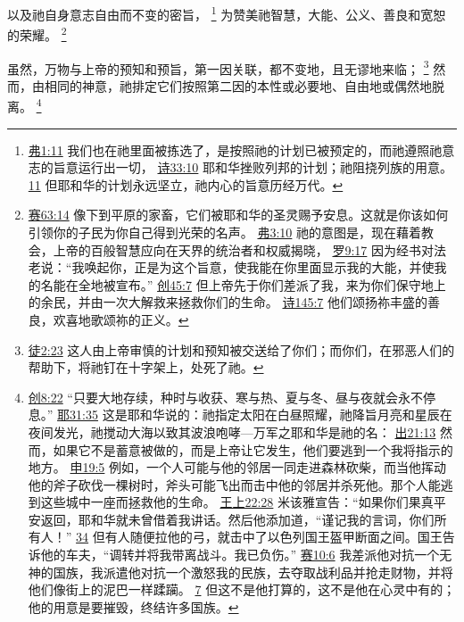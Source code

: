 \documentclass[12pt, a4paper, oneside]{ctexart}
\newcounter{parnum}[section]
\newcommand{\N}{%
   \noindent\refstepcounter{parnum}%
    \makebox[\parindent][l]{\textbf{\arabic{parnum}.}}}
\begin{document}
	以及祂自身意志自由而不变的密旨，
	\footnote {
		\href{https://biblehub.com/ephesians/1-11.htm}{弗1:11} 我们也在祂里面被拣选了，是按照祂的计划已被预定的，而祂遵照祂意志的旨意运行出一切，
		\href{https://biblehub.com/psalms/33-10.htm}{诗33:10} 耶和华挫败列邦的计划；祂阻挠列族的用意。
		\href{https://biblehub.com/psalms/33-11.htm}{11} 但耶和华的计划永远坚立，祂内心的旨意历经万代。
	}
	为赞美祂智慧，大能、公义、善良和宽恕的荣耀。
	\footnote {
		\href{https://biblehub.com/isaiah/63-14.htm}{赛63:14} 像下到平原的家畜，它们被耶和华的圣灵赐予安息。这就是你该如何引领你的子民为你自己得到光荣的名声。
		\href{https://biblehub.com/ephesians/3-10.htm}{弗3:10} 祂的意图是，现在藉着教会，上帝的百般智慧应向在天界的统治者和权威揭晓，
		\href{https://biblehub.com/romans/9-17.htm}{罗9:17} 因为经书对法老说：“我唤起你，正是为这个旨意，使我能在你里面显示我的大能，并使我的名能在全地被宣布。”
		\href{https://biblehub.com/genesis/45-7.htm}{创45:7} 但上帝先于你们差派了我，来为你们保守地上的余民，并由一次大解救来拯救你们的生命。
		\href{https://biblehub.com/psalms/145-7.htm}{诗145:7} 他们颂扬祢丰盛的善良，欢喜地歌颂祢的正义。
	}

\N 虽然，万物与上帝的预知和预旨，第一因关联，都不变地，且无谬地来临；
	\footnote {
		\href{https://biblehub.com/acts/2-23.htm}{徒2:23} 这人由上帝审慎的计划和预知被交送给了你们；而你们，在邪恶人们的帮助下，将祂钉在十字架上，处死了祂。
	}
	然而，由相同的神意，祂排定它们按照第二因的本性或必要地、自由地或偶然地脱离。
	\footnote {
		\href{https://biblehub.com/genesis/8-22.htm}{创8:22} “只要大地存续，种时与收获、寒与热、夏与冬、昼与夜就会永不停息。”
		\href{https://biblehub.com/jeremiah/31-35.htm}{耶31:35} 这是耶和华说的：祂指定太阳在白昼照耀，祂降旨月亮和星辰在夜间发光，祂搅动大海以致其波浪咆哮---万军之耶和华是祂的名：
		\href{https://biblehub.com/exodus/21-13.htm}{出21:13} 然而，如果它不是蓄意被做的，而是上帝让它发生，他们要逃到一个我将指示的地方。
		\href{https://biblehub.com/deuteronomy/19-5.htm}{申19:5} 例如，一个人可能与他的邻居一同走进森林砍柴，而当他挥动他的斧子砍伐一棵树时，斧头可能飞出而击中他的邻居并杀死他。那个人能逃到这些城中一座而拯救他的生命。
		\href{https://biblehub.com/1_kings/22-28.htm}{王上22:28} 米该雅宣告：“如果你们果真平安返回，耶和华就未曾借着我讲话。然后他添加道，“谨记我的言词，你们所有人！”
		\href{https://biblehub.com/1_kings/22-34.htm}{34} 但有人随便拉他的弓，就击中了以色列国王盔甲断面之间。国王告诉他的车夫，“调转并将我带离战斗。我已负伤。”
		\href{https://biblehub.com/isaiah/10-6.htm}{赛10:6} 我差派他对抗一个无神的国族，我派遣他对抗一个激怒我的民族，去夺取战利品并抢走财物，并将他们像街上的泥巴一样蹂躏。
		\href{https://biblehub.com/isaiah/10-7.htm}{7} 但这不是他打算的，这不是他在心灵中有的；他的用意是要摧毁，终结许多国族。
	}
\end{document}
